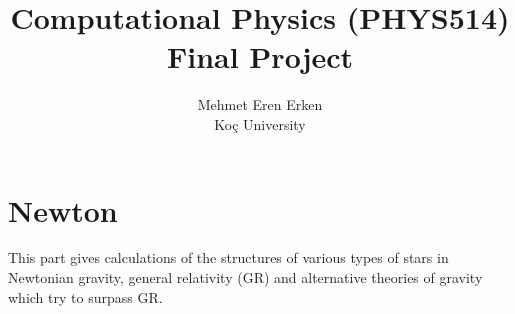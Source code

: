 \documentclass{article}
\title{Computational Physics (PHYS514) Final Project}
\author{Mehmet Eren Erken \\
Koç University}
\date{}
\begin{document}
\maketitle

\section*{Newton}

This part gives calculations of the structures of various types of stars in Newtonian gravity, general relativity (GR) and alternative theories of gravity which try to surpass GR.
\end{document}
